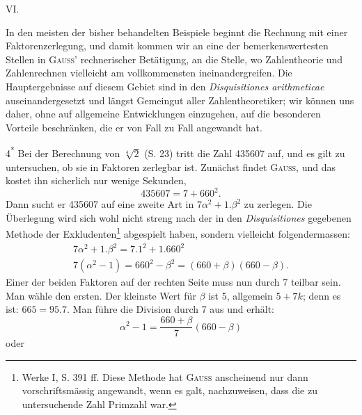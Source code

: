 \clearpage\begingroup
{}
\renewcommand{\thefootnote}{\arabic{footnote})}\setcounter{footnote}{0}
\begin{center}VI.\\[3pt]{\large{}}\end{center}
\noindent\hspace*{\parindent}In den meisten der bisher behandelten Beispiele beginnt die Rechnung
mit einer Faktorenzerlegung, und damit kommen wir an eine der bemerkenswertesten Stellen in \textsc{Gauss}’ rechnerischer Betätigung, an die Stelle, wo Zahlentheorie und Zahlenrechnen vielleicht am vollkommensten ineinandergreifen.
Die Hauptergebnisse auf diesem Gebiet sind in den \textit{Disquisitiones arithmeticae}
auseinandergesetzt und längst Gemeingut aller Zahlentheoretiker; wir können
uns daher, ohne auf allgemeine Entwicklungen einzugehen, auf die besonderen
Vorteile beschränken, die er von Fall zu Fall angewandt hat.
\par\hfill 4\textsuperscript{*}
\clearpage{}
\noindent\hspace*{\parindent}Bei der Berechnung von $\sqrt[4]{2}$ (S. 23) tritt die Zahl 435607 auf, und es
gilt zu untersuchen, ob sie in Faktoren zerlegbar ist. Zunächst findet \textsc{Gauss},
und das kostet ihn sicherlich nur wenige Sekunden,
\[
435607=7+660^2.
\]
\noindent Dann sucht er 435607 auf eine zweite Art in $7\alpha^2+1\mathord{.}\beta^2$ zu zerlegen. Die
Überlegung wird sich wohl nicht streng nach der in den \textit{Disquisitiones} gegebenen Methode der Exkludenten\footnote{Werke I, S. 391 ff. Diese Methode hat \textsc{Gauss} anscheinend nur dann vorschriftsmässig angewandt, wenn es galt, nachzuweisen, dass die zu untersuchende Zahl Primzahl war.} abgespielt haben, sondern vielleicht folgendermassen:
\[
\begin{gathered}
7\alpha^2+1\mathord{.}\beta^2=7\mathord{.}1^2+1\mathord{.}660^2\\
7(\alpha^2-1)=660^2-\beta^2=(660+\beta)(660-\beta).
\end{gathered}
\]
\noindent Einer der beiden Faktoren auf der rechten Seite muss nun durch 7 teilbar
sein. Man wähle den ersten. Der kleinste Wert für $\beta$ ist 5, allgemein $5+7k$;
denn es ist: $665=95\mathord{.}7$. Man führe die Division durch 7 aus und erhält:
\[
\alpha^2-1=\frac{660+\beta}{7}(660-\beta)
\]
\noindent oder

